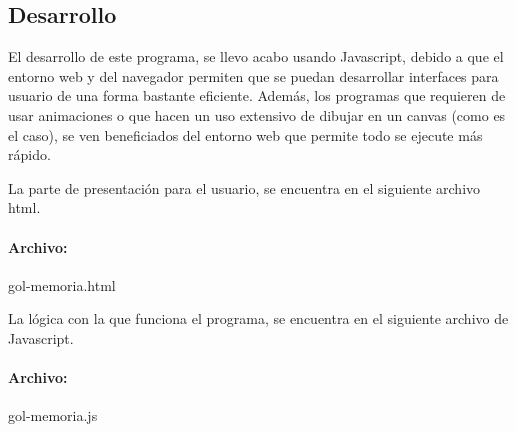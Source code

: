 \subsection{Desarrollo}
	El desarrollo de este programa, se llevo acabo usando Javascript, debido a que el entorno web y del navegador permiten que se puedan desarrollar interfaces para usuario de una forma bastante eficiente. Además, los programas que requieren de usar animaciones o que hacen un uso extensivo de dibujar en un canvas (como es el caso), se ven beneficiados del entorno web que permite todo se ejecute más rápido.

	La parte de presentación para el usuario, se encuentra en el siguiente archivo html.
	
	\paragraph{Archivo: } gol-memoria.html
	
	
	La lógica con la que funciona el programa, se encuentra en el siguiente archivo de Javascript.

	\paragraph{Archivo: } gol-memoria.js
	
